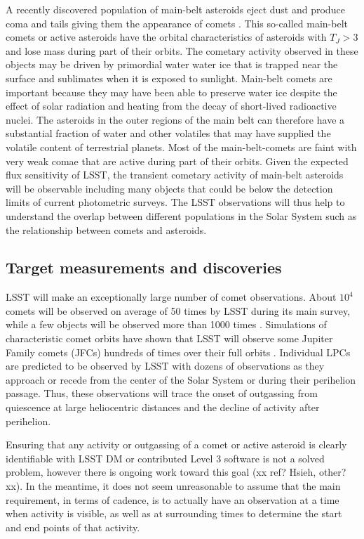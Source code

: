A recently discovered population of main-belt asteroids eject
dust and produce coma and tails giving them the appearance of
comets \citep{2012AJ....143...66J}.  This so-called main-belt
comets or active asteroids have the orbital characteristics of
asteroids with $T_J > 3$ and lose mass during part of their
orbits. The cometary activity observed in these objects may be
driven by primordial water water ice that is trapped near the
surface and sublimates when it is exposed to sunlight.
Main-belt comets are important because they may have been able to
preserve water ice despite the effect of solar radiation and
heating from the decay of short-lived radioactive nuclei.  The
asteroids in the outer regions of the main belt can therefore
have a substantial fraction of water and other volatiles that
may have supplied the volatile content of terrestrial planets.
Most of the main-belt-comets are faint with very weak comae
that are active during part of their orbits. Given the
expected flux sensitivity of LSST, the transient cometary
activity of main-belt asteroids will be observable including
many objects that could be below the detection limits of
current photometric surveys.  The LSST observations will thus
help to understand the overlap between different populations
in the Solar System such as the relationship between comets
and asteroids.


\subsection{Target measurements and discoveries}
\label{sec:\secname:targets}

LSST will make an exceptionally large number of comet
observations.  About $10^4$ comets will be observed on average
of 50 times by LSST during its main survey, while a few objects
will be observed more than 1000 times
\citep{2010PhDT.......241S}.  Simulations of characteristic
comet orbits have shown that LSST will observe some Jupiter
Family comets (JFCs) hundreds of times over their full orbits
\citep{2010PhDT.......241S}.  Individual LPCs are predicted to
be observed by LSST with dozens of observations as they
approach or recede from the center of the Solar System or
during their perihelion passage.  Thus, these observations
will trace the onset of outgassing from quiescence at large
heliocentric distances and the decline of activity after
perihelion.

Ensuring that any activity or outgassing of a comet or active asteroid
is clearly identifiable with LSST DM or contributed Level 3 software is not a
solved problem, however there is ongoing work toward this goal (xx
ref? Hsieh, other? xx). In the meantime, it does not seem unreasonable
to assume that the main requirement, in terms of cadence, is to actually
have an observation at a time when activity is visible, as well as at
surrounding times to determine the start and end points of that activity.

